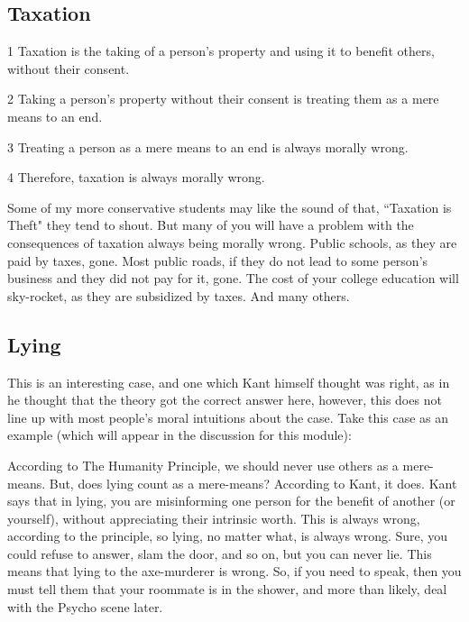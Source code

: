 \subsection{Taxation}
\begin{earg}
    \item[1] Taxation is the taking of a person’s property and using it to benefit others, without their consent.
    \item[2] Taking a person’s property without their consent is treating them as a mere means to an end.
    \item[3] Treating a person as a mere means to an end is always morally wrong.
    \item[4] Therefore, taxation is always morally wrong.
\end{earg}
Some of my more conservative students may like the sound of that, ``Taxation is Theft" they tend to shout. But many of you will have a problem with the consequences of taxation always being morally wrong. Public schools, as they are paid by taxes, gone. Most public roads, if they do not lead to some person's business and they did not pay for it, gone. The cost of your college education will sky-rocket, as they are subsidized by taxes. And many others.

\subsection{Lying}

This is an interesting case, and one which Kant himself thought was right, as in he thought that the theory got the correct answer here, however, this does not line up with most people's moral intuitions about the case. Take this case as an example (which will appear in the discussion for this module):


According to The Humanity Principle, we should never use others as a mere-means. But, does lying count as a mere-means? According to Kant, it does. Kant says that in lying, you are misinforming one person for the benefit of another (or yourself), without appreciating their intrinsic worth. This is always wrong, according to the principle, so lying, no matter what, is always wrong. Sure, you could refuse to answer, slam the door, and so on, but you can never lie. This means that lying to the axe-murderer is wrong. So, if you need to speak, then you must tell them that your roommate is in the shower, and more than likely, deal with the Psycho scene later. 

